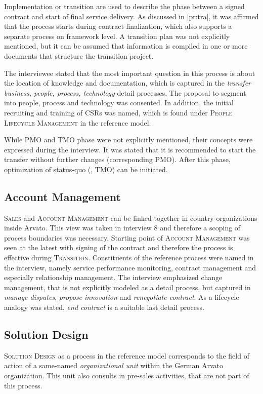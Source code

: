 	Implementation or transition are used to describe the phase between a signed contract and start of final service delivery. As discussed in \ref{pr:tra}, it was affirmed that the process starts during contract finalization, which also supports a separate process on framework level.  A transition plan was not explicitly mentioned, but it can be assumed that information is compiled in one or more documents that structure the transition project. 
	
	The interviewee stated that the most important question in this process is about the location of knowledge and documentation, which is captured in the \textit{transfer business, people, process, technology} detail processes. The proposal to segment into people, process and technology was consented. In addition, the initial recruiting and training of \acrshort{CSR}s was named, which is found under \textsc{People Lifecycle Management} in the reference model. 
	
	While \acrshort{PMO} and \acrshort{TMO} phase were not explicitly mentioned, their concepts were expressed during the interview. It was stated that it is recommended to start the transfer without further changes (corresponding \acrshort{PMO}). After this phase, optimization of status-quo (\ie, \acrshort{TMO}) can be initiated. 
	
	\subsection{Account Management}
	 \textsc{Sales} and \textsc{Account Management} can be linked together in country organizations inside Arvato. This view was taken in interview 8 and therefore a scoping of process boundaries was necessary. Starting point of \textsc{Account Management} was seen at the latest with signing of the contract and therefore the process is effective during \textsc{Transition}. Constituents of the reference process were named in the interview, namely service performance monitoring, contract management and especially relationship management. The interview emphasized change management, that is not explicitly modeled as a detail process, but captured in \textit{manage disputes}, \textit{propose innovation} and \textit{renegotiate contract}. As a lifecycle analogy was stated, \textit{end contract} is a suitable last detail process. 
          
   	\subsection{Solution Design}
	\textsc{Solution Design} as a process in the reference model corresponds to the field of action of a same-named \textit{organizational unit} within the German Arvato organization. This unit also consults in pre-sales activities, that are not part of this process. 
	
